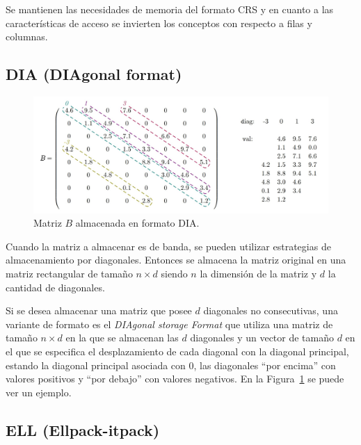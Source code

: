  Se mantienen las necesidades de memoria del formato CRS y en cuanto a las características de acceso se invierten los conceptos con respecto  a filas y columnas.
 
\subsection{DIA (DIAgonal format)}\label{dia-format}

 \begin{figure}[h]
     \centering
     \includegraphics[width=\textwidth]{imagenes/chapter2/diag-format-B.png}
     \caption{Matriz $B$ almacenada en formato DIA.}
     \label{fig:diag-format}
 \end{figure}
 
 
 Cuando la matriz a almacenar es de banda, se pueden utilizar estrategias de almacenamiento por diagonales.
Entonces se almacena la matriz original en una matriz rectangular de tamaño  $n \times d$ siendo $n$ la dimensión de la matriz y $d$ la cantidad de diagonales.


 Si se desea almacenar una matriz que posee $d$ diagonales no consecutivas, %
 una variante de formato es el \textit{DIAgonal storage Format}  que  utiliza una matriz de tamaño $n\times d$ en la que se almacenan las $d$ diagonales y un vector de tamaño $d$ en el que se  especifica el desplazamiento de cada diagonal con la diagonal principal, estando la diagonal principal asociada con 0, las diagonales ``por encima'' con valores positivos y ``por debajo'' con valores negativos. En la Figura~\ref{fig:diag-format} se puede ver un ejemplo.
 


\subsection{ELL (Ellpack-itpack)}\label{ell-format}


